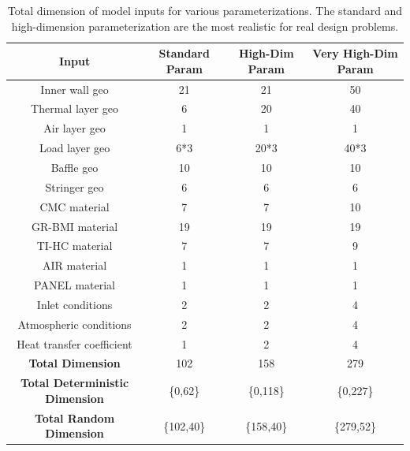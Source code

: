 \documentclass{article}
\begin{document}
\begin{table}
\caption[Dimensions of model inputs]{Total dimension of model inputs for various parameterizations. The standard and high-dimension parameterization are the most realistic for real design problems.}
\label{tab:inputDimension}
\begin{center}
\begin{tabular}[]{ c | c | c | c}
\textbf{Input} & \textbf{Standard Param} & \textbf{High-Dim Param} & \textbf{Very High-Dim Param}\\ \hline
Inner wall geo            & 21  & 21   & 50   \\ \hline
Thermal layer geo         & 6   & 20   & 40   \\ \hline
Air layer geo             & 1   & 1    & 1    \\ \hline
Load layer geo            & 6*3 & 20*3 & 40*3 \\ \hline
Baffle geo                & 10  & 10   & 10   \\ \hline
Stringer geo              & 6   & 6    & 6    \\ \hline
CMC material              & 7   & 7    & 10   \\ \hline
GR-BMI material           & 19  & 19   & 19   \\ \hline
TI-HC material            & 7   & 7    & 9    \\ \hline
AIR material              & 1   & 1    & 1    \\ \hline
PANEL material            & 1   & 1    & 1    \\ \hline
Inlet conditions          & 2   & 2    & 4    \\ \hline
Atmospheric conditions    & 2   & 2    & 4    \\ \hline
Heat transfer coefficient & 1   & 2    & 4    \\ \hline \hline
\textbf{Total Dimension}  & 102 & 158  & 279  \\ \hline
\textbf{Total Deterministic Dimension} & \{0,62\} & \{0,118\} & \{0,227\} \\ \hline
\textbf{Total Random Dimension} & \{102,40\} & \{158,40\} & \{279,52\} \\ \hline
\end{tabular}
\end{center}
\end{table}
\end{document}

